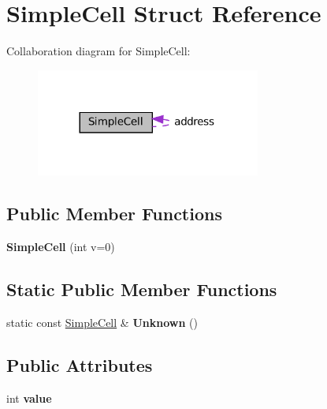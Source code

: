 \hypertarget{structSimpleCell}{}\section{Simple\+Cell Struct Reference}
\label{structSimpleCell}


Collaboration diagram for Simple\+Cell\+:
\nopagebreak
\begin{figure}[H]
\begin{center}
\leavevmode
\includegraphics[width=209pt]{structSimpleCell__coll__graph}
\end{center}
\end{figure}
\subsection*{Public Member Functions}
\begin{DoxyCompactItemize}
\item 
\mbox{\label{structSimpleCell_ab4228a4489ad13a05fe37b23c8651868}} 
{\bfseries Simple\+Cell} (int v=0)
\end{DoxyCompactItemize}
\subsection*{Static Public Member Functions}
\begin{DoxyCompactItemize}
\item 
\mbox{\label{structSimpleCell_af08b120c1be63115d3096ad9c7ca4da7}} 
static const \hyperlink{structSimpleCell}{Simple\+Cell} \& {\bfseries Unknown} ()
\end{DoxyCompactItemize}
\subsection*{Public Attributes}
\begin{DoxyCompactItemize}
\item 
\mbox{\label{structSimpleCell_a7262ca753420e792e551d19379c70086}} 
int {\bfseries value}
\end{DoxyCompactItemize}
